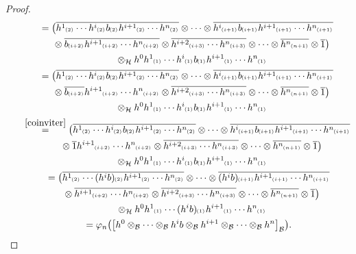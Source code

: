 \documentclass[pdftex]{sigma}
\numberwithin{equation}{section}
\newcommand{\ps}[1]{~\hspace{-4pt}_{^{(#1)}}}
\newcommand{\wbar}[1]{\overline{#1}}
\begin{document}
\begin{proof}
\begin{gather*}
\qquad
=\big(\wbar{h^1\ps{2}\cdots h^i\ps{2}b\ps{2}h^{i+1}\ps{2}\cdots h^n\ps{2}}\otimes\dots\otimes
\wbar{h^i\ps{i+1}b\ps{i+1}h^{i+1}\ps{i+1}\cdots h^n\ps{i+1}}
\\
\qquad\phantom{=}{} \otimes
\wbar{b\ps{i+2}h^{i+1}\ps{i+2}\cdots h^n\ps{i+2}} \otimes \wbar{h^{i+2}\ps{i+3}\cdots
h^n\ps{i+3}}\otimes\cdots\otimes\wbar{h^n\ps{n+1}} \otimes \wbar{1}\big) \\
\qquad\phantom{=}{} \otimes_{\cal H}
h^0h^1\ps{1}\cdots h^{i}\ps{1}b\ps{1}h^{i+1}\ps{1}\cdots h^n\ps{1}
\\
\qquad
=\big(\wbar{h^1\ps{2}\cdots h^i\ps{2}b\ps{2}h^{i+1}\ps{2}\cdots h^n\ps{2}}\otimes\dots\otimes
\wbar{h^i\ps{i+1}b\ps{i+1}h^{i+1}\ps{i+1}\cdots h^n\ps{i+1}}
\\
\qquad\phantom{=}{} \otimes
\wbar{b\ps{i+2}}h^{i+1}\ps{i+2}\cdots h^n\ps{i+2} \otimes \wbar{h^{i+2}\ps{i+3}\cdots
h^n\ps{i+3}}\otimes\cdots\otimes\wbar{h^n\ps{n+1}} \otimes \wbar{1}\big) \\
\qquad\phantom{=}{}\otimes_{\cal H}
h^0h^1\ps{1}\cdots h^{i}\ps{1}b\ps{1}h^{i+1}\ps{1}\cdots h^n\ps{1}
\\
\qquad
\stackrel{\eqref{coinviter}}{=}
\big(\wbar{h^1\ps{2}\cdots h^i\ps{2}b\ps{2}h^{i+1}\ps{2}\cdots h^n\ps{2}}\otimes\dots\otimes
\wbar{h^i\ps{i+1}b\ps{i+1}h^{i+1}\ps{i+1}\cdots h^n\ps{i+1}}
\\
\qquad\phantom{=}{}
\otimes
\wbar{1}h^{i+1}\ps{i+2}\cdots h^n\ps{i+2} \otimes \wbar{h^{i+2}\ps{i+3}\cdots
h^n\ps{i+3}}\otimes\cdots\otimes\wbar{h^n\ps{n+1}} \otimes \wbar{1}\big) \\
\qquad\phantom{=}{} \otimes_{\cal H}
h^0h^1\ps{1}\cdots h^{i}\ps{1}b\ps{1}h^{i+1}\ps{1}\cdots h^n\ps{1}
\\
\qquad{}
=\big(\wbar{h^1\ps{2}\cdots (h^ib)\ps{2}h^{i+1}\ps{2}\cdots h^n\ps{2}}\otimes\cdots\otimes
\wbar{(h^ib)\ps{i+1}h^{i+1}\ps{i+1}\cdots h^n\ps{i+1}}
\\
\qquad\phantom{=}{} \otimes
\wbar{h^{i+1}\ps{i+2}\cdots h^n\ps{i+2}} \otimes \wbar{h^{i+2}\ps{i+3}\cdots
h^n\ps{i+3}}\otimes\cdots\otimes\wbar{h^n\ps{n+1}} \otimes \wbar{1}\big) \\
\qquad\phantom{=}{} \otimes_{\cal H}
h^0h^1\ps{1}\cdots (h^{i}b)\ps{1}h^{i+1}\ps{1}\cdots h^n\ps{1}
\\
\qquad{}
=\varphi_n\big(\big[h^0\otimes_{\cal B}\cdots\otimes_{\cal B} h^ib\otimes_{\cal B} h^{i+1}\otimes_{\cal
B}\cdots\otimes_{\cal B} h^n\big]_{\cal B}\big).
\end{gather*}


\end{proof}
\end{document}
